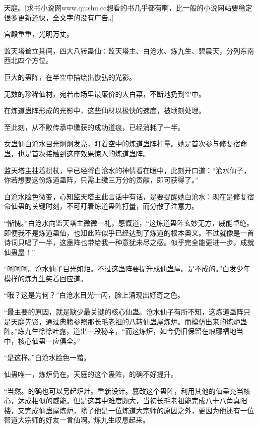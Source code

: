 
\begin{this_body}

天庭。[求书小说网www.qiushu.cc想看的书几乎都有啊，比一般的小说网站要稳定很多更新还快，全文字的没有广告。]

宫殿重重，光明万丈。

监天塔耸立其间，四大八转蛊仙：监天塔主、白沧水、炼九生、碧晨天，分列东南西北四个方位。

巨大的蛊阵，在半空中描绘出恢弘的光影。

无数的珍稀仙材，宛若市场里最廉价的大白菜，不断地扔到空中。

在炼道蛊阵形成的光影中，这些仙材以极快的速度，被顷刻处理。

至此刻，从不败传承中缴获的成功道痕，已经消耗了一半。

女蛊仙白沧水目光炯炯发亮，盯着空中的炼道蛊阵打量。她是首次参与修复宿命蛊，也是首次接触到这座效果惊人的炼道蛊阵。

监天塔主拄着拐杖，早已经将白沧水的神情看在眼中，此刻开口道：“沧水仙子，你若想要这份炼道蛊阵，只需上缴三万分的贡献，即可获得了。”

白沧水脸色微变，心知监天塔主此言话中有话，是要提醒她白沧水：现在是修复宿命仙蛊的关键时刻，不可盯着炼道蛊阵打量，而分散了注意力。

“惭愧。”白沧水向监天塔主微微一礼，感慨道，“这炼道蛊阵玄妙无方，威能卓绝。即便我不是炼道蛊仙，也知此阵似乎已经达到了炼道的根本奥义。不过就像是一首诗词只唱了一半，这蛊阵也带给我一种意犹未尽之感。似乎完全能更进一步，成就仙蛊屋！”

“呵呵呵。沧水仙子目光如炬。不过这蛊阵要提升成仙蛊屋。是不成的。”白发少年模样的炼九生笑着回应道。

“哦？这是为何？”白沧水目光一闪，脸上涌现出好奇之色。

“最主要的原因，就是缺少最关键的核心仙蛊。沧水仙子有所不知，这炼道蛊阵只是天庭先贤，通过典籍参照那长毛老祖的八转仙蛊屋炼炉。而模仿出来的炼炉蛊阵。”炼九生徐徐吐露，道出一段秘辛，“而这炼炉，如今仍旧保留在琅琊福地当中，核心仙蛊一应俱全。”

“是这样。”白沧水脸色一黯。

仙蛊唯一，炼炉仍在。天庭的这个蛊阵，的确不好提升。

“当然。的确也可以另起炉灶。重新设计。篡改这个蛊阵，利用其他的仙蛊充当核心，达成相似的威能。但是这其中难度颇大，当初长毛老祖能完成八十八角真阳楼，又完成仙蛊屋炼炉，除了他是一位炼道大宗师的原因之外，更因为他还有一位智道大宗师的好友一言仙啊。”炼九生叹息起来。


\end{this_body}
